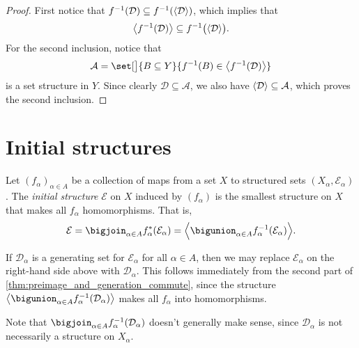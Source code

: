 \documentclass[article, a4paper, 11pt, oneside]{memoir}
\numberwithin{equation}{chapter}
\newcommand{\calE}{\mathcal{E}}
\newcommand{\calD}{\mathcal{D}}
\newcommand{\calA}{\mathcal{A}}
\DeclarePairedDelimiter{\gen}{\langle}{\rangle} %
\newcommand{\preim}{^{-1}}
\begin{document}
\begin{proof}
    First notice that $f\preim(\calD) \subseteq f\preim(\gen{\calD})$, which implies that
    \begin{equation*}
        \gen[\big]{f\preim(\calD)} \subseteq f\preim\bigl( \gen{\calD} \bigr).
    \end{equation*}
    For the second inclusion, notice that
    \begin{equation*}
        \calA = \set[\big]{B \subseteq Y}{f\preim(B) \in \gen[\big]{f\preim(\calD)}}
    \end{equation*}
    is a set structure in $Y$. Since clearly $\calD \subseteq \calA$, we also have $\gen{\calD} \subseteq \calA$, which proves the second inclusion.
\end{proof}


\section{Initial structures}

\begin{definition}
    Let $(f_\alpha)_{\alpha \in A}$ be a collection of maps from a set $X$ to structured sets $(X_\alpha, \calE_\alpha)$. The \emph{initial structure} $\calE$ on $X$ induced by $(f_\alpha)$ is the smallest structure on $X$ that makes all $f_\alpha$ homomorphisms. That is,
    \begin{equation*}
        \calE
            = \bigjoin_{\alpha \in A} f_\alpha^*(\calE_\alpha)
            = \gen[\Big]{ \bigunion_{\alpha \in A} f_\alpha\preim(\calE_\alpha) }.
    \end{equation*}
\end{definition}

\begin{remark}
    \label{rem:initial_structure_generating_set}
    If $\calD_\alpha$ is a generating set for $\calE_\alpha$ for all $\alpha \in A$, then we may replace $\calE_\alpha$ on the right-hand side above with $\calD_\alpha$. This follows immediately from the second part of \cref{thm:preimage_and_generation_commute}, since the structure $\gen[\big]{ \bigunion_{\alpha \in A} f_\alpha\preim(\calD_\alpha) }$ makes all $f_\alpha$ into homomorphisms.

    Note that $\bigjoin_{\alpha \in A} f_\alpha\preim(\calD_\alpha)$ doesn't generally make sense, since $\calD_\alpha$ is not necessarily a structure on $X_\alpha$.
\end{remark}
\end{document}
